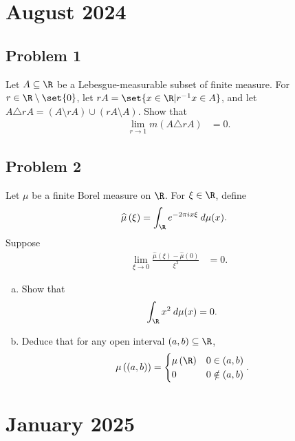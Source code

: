 \documentclass[10pt]{mypackage}
\begin{document}
\section{August 2024}%
\subsection{Problem 1}%
\begin{problem}
  Let $A\subseteq \R$ be a Lebesgue-measurable subset of finite measure. For $r\in\R\setminus \set{0}$, let $rA = \set{x\in \R | r^{-1}x\in A}$, and let $A\triangle rA = \left( A\setminus rA \right) \cup \left( rA\setminus A \right)$. Show that
  \begin{align*}
    \lim_{r\rightarrow 1} m\left( A\triangle rA \right) &= 0.
  \end{align*}
\end{problem}
\subsection{Problem 2}%
\begin{problem}
  Let $\mu$ be a finite Borel measure on $\R$. For $\xi\in\R$, define
  \begin{align*}
    \widehat{\mu}\left( \xi \right) &= \int_{\R}^{} e^{-2\pi i x\xi}\:d\mu(x).
  \end{align*}
  Suppose
  \begin{align*}
    \lim_{\xi\rightarrow 0} \frac{\widehat{\mu}\left( \xi \right) - \widehat{\mu}(0)}{\xi^2} &= 0.
  \end{align*}
  \begin{enumerate}[(a)]
    \item Show that
      \begin{align*}
        \int_{\R}^{} x^2\:d\mu(x) &= 0.
      \end{align*}
    \item Deduce that for any open interval $\left( a,b \right)\subseteq \R$,
      \begin{align*}
        \mu\left( \left( a,b \right) \right) &= \begin{cases}
          \mu\left( \R \right) & 0\in (a,b)\\
          0 & 0\notin (a,b)
        \end{cases}.
      \end{align*}
  \end{enumerate}
\end{problem}
\section{January 2025}%
\end{document}
